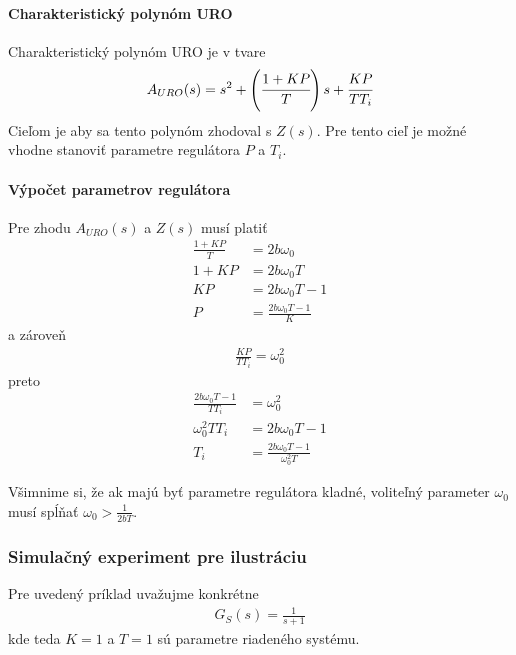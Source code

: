 \documentclass[a4paper, 10pt, ]{article}
\begin{document}
\paragraph{Charakteristický polynóm URO}

Charakteristický polynóm URO je v tvare
\begin{equation}
    A_{URO}(s) = s^2 + \left(\cfrac{1 + KP}{T}\right) s + \cfrac{KP}{TT_i}
\end{equation}
Cieľom je aby sa tento polynóm zhodoval s $Z(s)$. Pre tento cieľ je možné vhodne stanoviť parametre regulátora $P$ a $T_i$.

\paragraph{Výpočet parametrov regulátora}

Pre zhodu $A_{URO}(s)$ a  $Z(s)$ musí platiť
\begin{align}
    \frac{1+KP}{T} &= 2b\omega_0 \\
    1 + KP &= 2b\omega_0 T \\
    KP &= 2b\omega_0 T - 1 \\
    P &=  \frac{2b\omega_0 T - 1}{K} \label{Pcomp}
\end{align}
a zároveň
\begin{align}
    \frac{KP}{TT_i} = \omega_0^2 
\end{align}
preto
\begin{align}
    \frac{2b\omega_0 T - 1}{TT_i} &= \omega_0^2  \\
    \omega_0^2 TT_i &= 2b\omega_0 T - 1 \\
    T_i &= \frac{2b\omega_0 T - 1}{\omega_0^2 T} \label{Ticomp}
\end{align}

Všimnime si, že ak majú byť parametre regulátora kladné, voliteľný parameter $\omega_0$ musí spĺňať $\omega_0 > \frac{1}{2bT}$.





\subsubsection{Simulačný experiment pre ilustráciu}

Pre uvedený príklad uvažujme konkrétne
\begin{align}
    G_S(s) = \frac{1}{s+1}
\end{align}
kde teda $K=1$ a $T=1$ sú parametre riadeného systému. 
\end{document}
